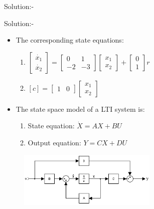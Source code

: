 \documentclass[journal,12pt,twocolumn]{IEEEtran}
\begin{document}
\begin{frame}{Solution:- }
\begin{frame}{Solution:- }
\begin{itemize}
    \item The corresponding state equations:\vspace{5}
    \begin{enumerate}
        \item $\begin{bmatrix}
\dot{x_1}\\
\dot{x_2}
\end{bmatrix} = \begin{bmatrix}
0 & 1\\
-2 & -3
\end{bmatrix} \begin{bmatrix}
x_1\\
x_2
\end{bmatrix} + \begin{bmatrix}
0\\
1
\end{bmatrix}r$
        \item $ [c] = \begin{bmatrix}
1 & 0
\end{bmatrix}\begin{bmatrix}
x_1\\
x_2
\end{bmatrix}$
    \end{enumerate}
    \item The state space model of a LTI system is:
    \begin{enumerate}
        \item State equation: $\dot{X} = AX + BU$
        \item Output equation: $Y = CX + DU$ 
    \end{enumerate}
\end{itemize}
\begin{figure}[h]
\includegraphics[width=250]{./figs/ssm.png}
\end{figure}
\end{frame}


\end{frame}
\end{document}
